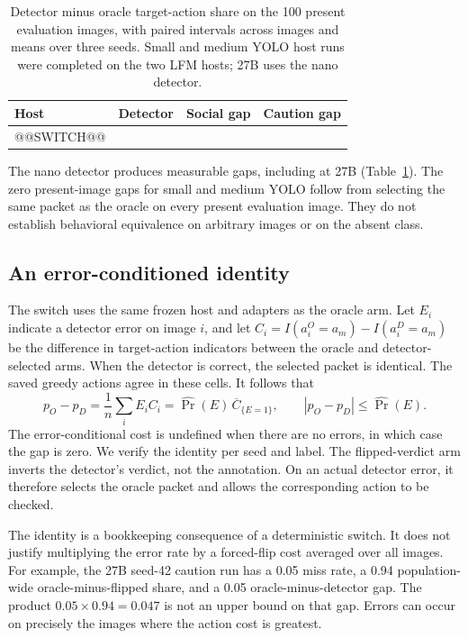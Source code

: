 \documentclass[10pt]{article}
\begin{document}
\begin{table}[htbp]\centering\small
\caption{Detector minus oracle target-action share on the 100 present
evaluation images, with paired intervals across images and means over
three seeds. Small and medium YOLO host runs were completed on the two
LFM hosts; 27B uses the nano detector.}\label{tab:switch}
\begin{tabular}{llll}\toprule
Host & Detector & Social gap & Caution gap\\\midrule
@@SWITCH@@
\bottomrule\end{tabular}
\end{table}

The nano detector produces measurable gaps, including at 27B
(Table~\ref{tab:switch}). The zero present-image gaps for small and
medium YOLO follow from selecting the same packet as the oracle on
every present evaluation image. They do not establish behavioral
equivalence on arbitrary images or on the absent class.

\subsection{An error-conditioned identity}
The switch uses the same frozen host and adapters as the oracle arm.
Let $E_i$ indicate a detector error on image $i$, and let
$C_i=I(a_i^{O}=a_m)-I(a_i^{D}=a_m)$ be the difference in target-action
indicators between the oracle and detector-selected arms. When the
detector is correct, the selected packet is identical. The saved
greedy actions agree in these cells. It follows that
\begin{equation}
 p_O-p_D = \frac1n\sum_i E_i C_i
          =\widehat{\Pr}(E)\,\overline C_{\{E=1\}},
 \qquad |p_O-p_D|\leq\widehat{\Pr}(E).
\end{equation}
The error-conditional cost is undefined when there are no errors, in
which case the gap is zero. We verify the identity per seed and label.
The flipped-verdict arm inverts the detector's verdict, not the
annotation. On an actual detector error, it therefore selects the
oracle packet and allows the corresponding action to be checked.

The identity is a bookkeeping consequence of a deterministic switch.
It does not justify multiplying the error rate by a forced-flip
cost averaged over all images. For example, the 27B seed-42 caution
run has a 0.05 miss rate, a 0.94 population-wide oracle-minus-flipped
share, and a 0.05 oracle-minus-detector gap. The product
$0.05\times0.94=0.047$ is not an upper bound on that gap. Errors can
occur on precisely the images where the action cost is greatest.
\end{document}
